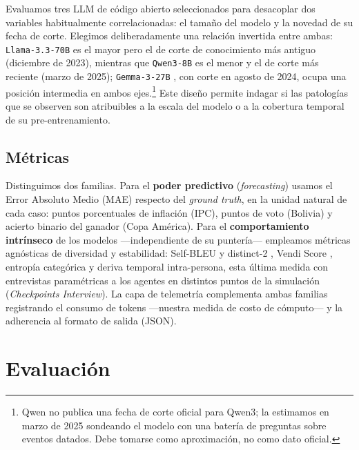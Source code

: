 \documentclass[11pt]{article}
\begin{document}
Evaluamos tres LLM de código abierto seleccionados para desacoplar dos variables habitualmente correlacionadas: el tamaño del modelo y la novedad de su fecha de corte. Elegimos deliberadamente una relación invertida entre ambas: \texttt{Llama-3.3-70B} \citep{llama33} es el mayor pero el de corte de conocimiento más antiguo (diciembre de 2023), mientras que \texttt{Qwen3-8B} \citep{qwen3} es el menor y el de corte más reciente (marzo de 2025); \texttt{Gemma-3-27B} \citep{gemma3}, con corte en agosto de 2024, ocupa una posición intermedia en ambos ejes.\footnote{Qwen no publica una fecha de corte oficial para Qwen3; la estimamos en marzo de 2025 sondeando el modelo con una batería de preguntas sobre eventos datados. Debe tomarse como aproximación, no como dato oficial.} Este diseño permite indagar si las patologías que se observen son atribuibles a la escala del modelo o a la cobertura temporal de su pre-entrenamiento.

\subsection{Métricas}

Distinguimos dos familias. Para el \textbf{poder predictivo} (\textit{forecasting}) usamos el Error Absoluto Medio (MAE) respecto del \textit{ground truth}, en la unidad natural de cada caso: puntos porcentuales de inflación (IPC), puntos de voto (Bolivia) y acierto binario del ganador (Copa América). Para el \textbf{comportamiento intrínseco} de los modelos —independiente de su puntería— empleamos métricas agnósticas de diversidad y estabilidad: Self-BLEU y distinct-2 \citep{li2016diversity,zhu2018texygen}, Vendi Score \citep{friedman2023vendi}, entropía categórica y deriva temporal intra-persona, esta última medida con entrevistas paramétricas a los agentes en distintos puntos de la simulación (\textit{Checkpoints Interview}). La capa de telemetría complementa ambas familias registrando el consumo de tokens —nuestra medida de costo de cómputo— y la adherencia al formato de salida (JSON).

\section{Evaluación}
\label{sec:evaluacion}
\end{document}
